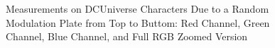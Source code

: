 {\begin{figure}[!htbp]
    \caption{Measurements on DC\textregistered\space Universe Characters Due to a Random Modulation Plate from Top to Buttom: 
    Red Channel, Green Channel, Blue Channel, and Full RGB Zoomed Version}
  \end{figure}
}
\afterpage{%
    
}
\afterpage{%
    
}
\afterpage{%
    
}
